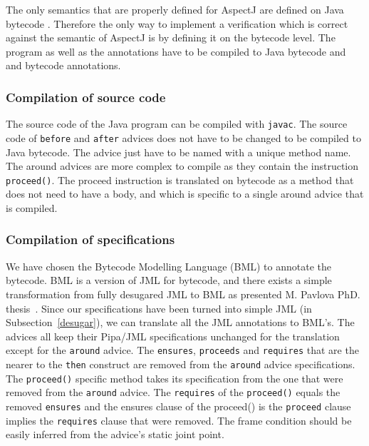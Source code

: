 The only semantics that are properly defined for AspectJ are defined
on Java bytecode \cite{weaving06,weaving04}. Therefore the only way to
implement a verification which is correct against the semantic of
AspectJ is by defining it on the bytecode level.  The program as well
as the annotations have to be compiled to Java bytecode and
and bytecode annotations. 

\subsubsection{Compilation of source code}
The source code of the Java program can be compiled with {\tt javac}.
The source code of {\tt before} and {\tt after}
advices does not have to be changed to be compiled to Java bytecode.
The advice just have to be named with a unique method name.
The around advices are more complex to compile as they contain the instruction
{\tt proceed()}. The proceed instruction is translated on bytecode as
a method that does not need to have a body, and which is specific 
to a single around advice that is compiled.


\subsubsection{Compilation of specifications} 
We have chosen the Bytecode Modelling Language (BML) to annotate the
bytecode. BML is a version of JML for bytecode, and there exists a
simple transformation from fully desugared JML to BML as presented
M. Pavlova PhD. thesis~\cite{PavlovaPhd}. Since our specifications
have been turned into simple JML (in Subsection~\ref{desugar}), we can
translate all the JML annotations to BML's. The advices all keep their
Pipa/JML specifications unchanged for the translation
except for the {\tt around} advice.
The {\tt ensures}, {\tt proceeds} and {\tt requires} that are the
nearer to the {\tt then} construct are removed from the {\tt around}
advice specifications. The {\tt proceed()} specific method takes its
specification from the one that were removed from the {\tt around} advice.
The {\tt requires} of the {\tt proceed()} equals the removed {\tt ensures}
and the ensures clause of the proceed() is the {\tt proceed} clause 
implies the {\tt requires} clause that were removed.
The frame condition should be easily inferred from the advice's 
static joint point.


